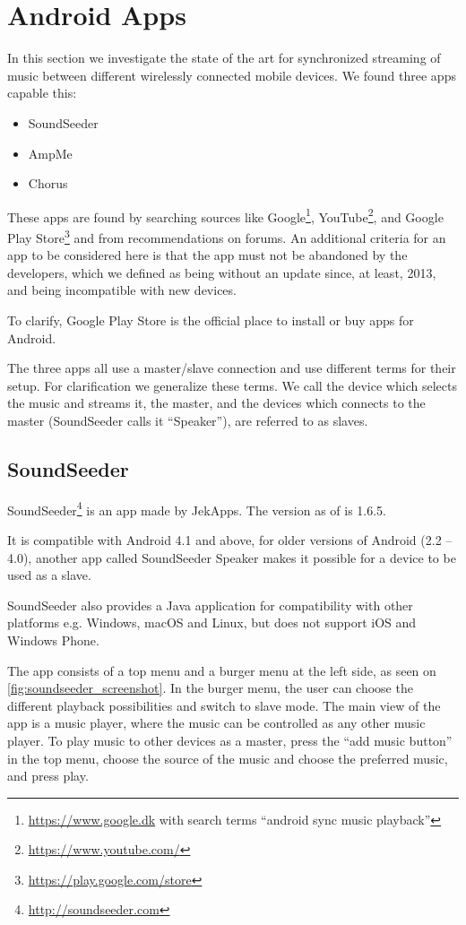 \section{Android Apps}\label{sec:sota_apps}
In this section we investigate the state of the art for synchronized streaming of music between different wirelessly connected mobile devices.
We found three apps capable this:
\begin{itemize}
    \item SoundSeeder
    \item AmpMe
    \item Chorus
\end{itemize}

These apps are found by searching sources like Google\footnote{\url{https://www.google.dk} with search terms ``android sync music playback''}, YouTube\footnote{\url{https://www.youtube.com/}}, and Google Play Store\footnote{\url{https://play.google.com/store}} and from recommendations on forums.
An additional criteria for an app to be considered here is that the app must not be abandoned by the developers,
which we defined as being without an update since, at least, 2013, and being incompatible with new devices.

To clarify, Google Play Store is the official place to install or buy apps for Android.

The three apps all use a master/slave connection and use different terms for their setup.
For clarification we generalize these terms.
We call the device which selects the music and streams it, the master, and the devices which connects to the master (SoundSeeder calls it ``Speaker''), are referred to as slaves.

\subsection{SoundSeeder}\label{subsec:soundseeder}
SoundSeeder\footnote{\url{http://soundseeder.com}} is an app made by JekApps.
The  version as of  is 1.6.5.

It is compatible with Android 4.1 and above, for older versions of Android (2.2 -- 4.0),
another app called SoundSeeder Speaker makes it possible for a device to be used as a slave.

SoundSeeder also provides a Java application for compatibility with other platforms e.g. Windows, macOS and Linux, but does not support iOS and Windows Phone\cite{soundseeder_ios}.

The app consists of a top menu and a burger menu at the left side, as seen on \cref{fig:soundseeder_screenshot}.
In the burger menu, the user can choose the different playback possibilities and switch to slave mode.
The main view of the app is a music player, where the music can be controlled as any other music player.
To play music to other devices as a master, press the ``add music button'' in the top menu,
choose the source of the music and choose the preferred music, and press play.

